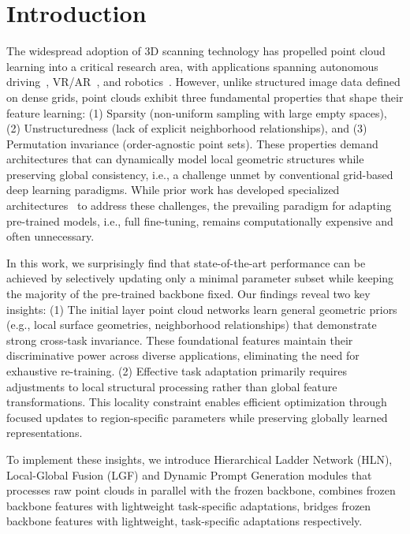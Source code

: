 \section{Introduction}
\label{sec:intro}


The widespread adoption of 3D scanning technology has propelled point cloud learning into a critical research area, with applications spanning autonomous driving~\cite{yang2024visual,song2024graphbev,chen20203d}, VR/AR~\cite{casado2023rendering,garrido2021point}, and robotics~\cite{wang2021trajectory,chen2022direct,christen2023learning}. 
However, unlike structured image data defined on dense grids, point clouds exhibit three fundamental properties that shape their feature learning: (1) Sparsity (non-uniform sampling with large empty spaces), (2) Unstructuredness (lack of explicit neighborhood relationships), and (3) Permutation invariance (order-agnostic point sets). 
These properties demand architectures that can dynamically model local geometric structures while preserving global consistency, i.e., a challenge unmet by conventional grid-based deep learning paradigms. 
While prior work has developed specialized architectures~\cite{qi2017pointnet, li2018pointcnn, qian2022pointnext, qi2017pointnet++, wang2019dynamic, wu2024point} to address these challenges, the prevailing paradigm for adapting pre-trained models, i.e., full fine-tuning, remains computationally expensive and often unnecessary.

In this work, we surprisingly find that state-of-the-art performance can be achieved by selectively updating only a minimal parameter subset while keeping the majority of the pre-trained backbone fixed. 
Our findings reveal two key insights:
(1) The initial layer point cloud networks learn general geometric priors (e.g., local surface geometries, neighborhood relationships) that demonstrate strong cross-task invariance. These foundational features maintain their discriminative power across diverse applications, eliminating the need for exhaustive re-training.
(2) Effective task adaptation primarily requires adjustments to local structural processing rather than global feature transformations. This locality constraint enables efficient optimization through focused updates to region-specific parameters while preserving globally learned representations.

To implement these insights, we introduce Hierarchical Ladder Network (HLN), Local-Global Fusion (LGF) and Dynamic Prompt Generation modules that processes raw point clouds in parallel with the frozen backbone,  combines frozen backbone features with lightweight task-specific adaptations, bridges frozen backbone features with lightweight, task-specific adaptations respectively. 

